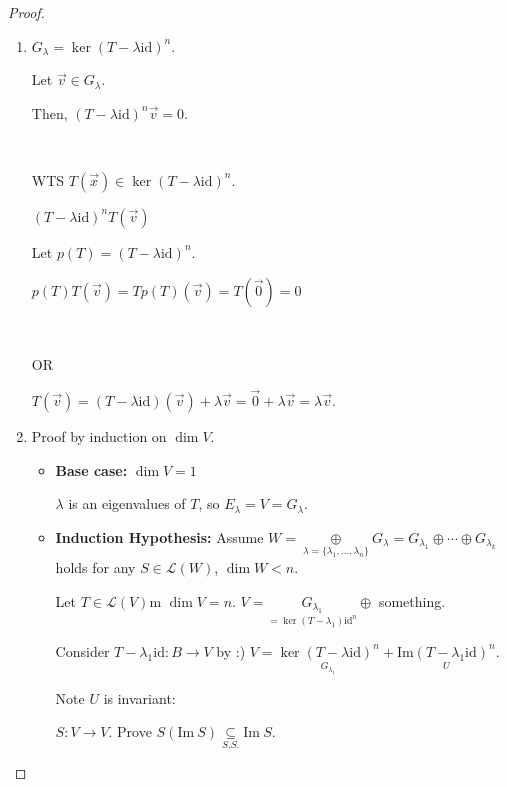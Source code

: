 \documentclass[11pt,fleqn]{book} %
\begin{document}
\begin{proof}
$\text{ }$
    \begin{enumerate}[label=\alph*)]
        \item $G_\lambda = \ker(T - \lambda\mathrm{id})^n$. 
        
        Let $\vec{v} \in G_\lambda$. 
        
        Then, $(T - \lambda\mathrm{id})^n\vec{v} = 0$. 
        
        {~~~}
        
        WTS $T(\vec{x}) \in \ker(T - \lambda\mathrm{id})^n$. 
        
        $(T - \lambda\mathrm{id})^n T(\vec{v})$
        
        Let $p(T) = (T - \lambda\mathrm{id})^n$. 
        
        $p(T)T(\vec{v}) = Tp(T)(\vec{v}) = T(\vec{0}) = 0$
        
        {~~~} 
        
        OR
        
        $T(\vec{v}) = (T - \lambda\mathrm{id})(\vec{v}) + \lambda\vec{v} = \vec{0} + \lambda\vec{v} = \lambda\vec{v}$. 
        
        \item Proof by induction on $\dim V$.
        
        \begin{itemize}
            \item \textbf{Base case:} $\dim V = 1$
            
            $\lambda$ is an eigenvalues of $T$, so $E_\lambda = V = G_\lambda$. 
            
            \item \textbf{Induction Hypothesis:} Assume $W = \underset{\lambda=\{\lambda_1, \dots, \lambda_n\}}{\oplus}G_\lambda = G_{\lambda_1} \oplus \cdots \oplus G_{\lambda_k}$ holds for any $S \in \mathcal{L}(W)$, $\dim W < n$. 
            
            Let $T \in \mathcal{L}(V)$m $\dim V = n$. $V = \underset{=\ker(T-\lambda_1)\mathrm{id}^n}{G_{\lambda_1}} \oplus $ something. 
            
            Consider $T - \lambda_1\mathrm{id}: B \to V$ by :) $V = \underset{G_{\lambda_1}}{\ker(T - \lambda\mathrm{id})^n} + \underset{U}{\mathrm{Im}(T-\lambda_1\mathrm{id})^n}$. 
            
            Note $U$ is invariant: 
            \begin{exercise}
                $S: V \to V$. Prove $S(\mathrm{Im}~S) \underset{S.S.}{\subseteq} \mathrm{Im}~S$. 
                

\end{exercise}
\end{itemize}
\end{enumerate}
\end{proof}
\end{document}

